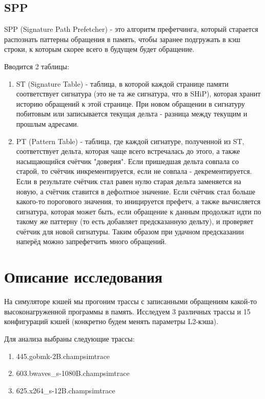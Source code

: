\documentclass[12pt]{extarticle}
\begin{document}
\subsection{SPP}

SPP (Signature Path Prefetcher) - это алгоритм префетчинга, который старается распознать паттерны обращения в память, чтобы заранее подгружать в кэш строки, к которым скорее всего в будущем будет обращение. 

Вводится 2 таблицы:

\begin{enumerate}
    \item ST (Signature Table) - таблица, в которой каждой странице памяти соответствует сигнатура (это не та же сигнатура, что в SHiP), которая хранит историю обращений к этой странице. При новом обращении в сигнатуру побитовым или записывается текущая дельта - разница между текущим и прошлым адресами.
    \item PT (Pattern Table) - таблица, где каждой сигнатуре, полученной из ST, соответствует дельта, которая чаще всего встречалась до этого, а также насыщающийся счётчик "доверия". Если пришедшая дельта совпала со старой, то счётчик инкрементируется, если не совпала - декрементируется. Если в результате счётчик стал равен нулю старая дельта заменяется на новую, а счётчик ставится в дефолтное значение. Если счётчик стал больше какого-то порогового значения, то иницируется префетч, а также вычисляется сигнатура, которая может быть, если обращение к данным продолжат идти по такому же паттерну (то есть добавляет предсказанную дельту), и проверяет счётчик для новой сигнатуры. Таким образом при удачном предсказании наперёд можно запрефетчить много обращений.
\end{enumerate}

\section{Описание исследования}

На симуляторе кэшей мы прогоним трассы с записанными обращениям какой-то высоконагруженной программы в память. Исследуем 3 различных трассы и 15 конфигураций кэшей (конкретно будем менять параметры L2-кэша).

Для анализа выбраны следующие трассы:

\begin{enumerate}
    \item 445.gobmk-2B.champsimtrace
    \item 603.bwaves\_s-1080B.champsimtrace
    \item 625.x264\_s-12B.champsimtrace
\end{enumerate}
\end{document}
